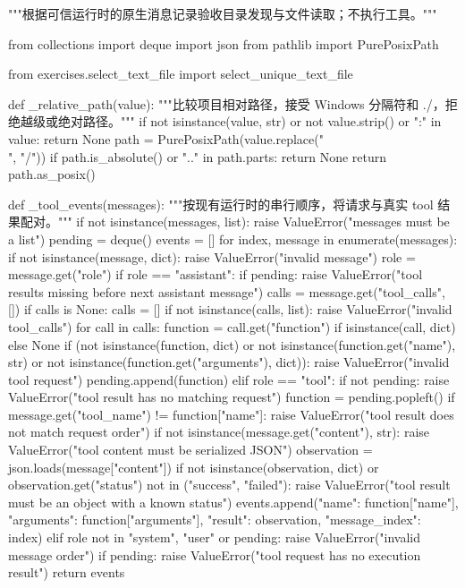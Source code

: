 \documentclass[UTF8,zihao=-4,fontset=fandol]{ctexart}
\begin{document}
\begin{Code}
"""根据可信运行时的原生消息记录验收目录发现与文件读取；不执行工具。"""

from collections import deque
import json
from pathlib import PurePosixPath

from exercises.select_text_file import select_unique_text_file


def _relative_path(value):
    """比较项目相对路径，接受 Windows 分隔符和 ./，拒绝越级或绝对路径。"""
    if not isinstance(value, str) or not value.strip() or ":" in value:
        return None
    path = PurePosixPath(value.replace("\\", "/"))
    if path.is_absolute() or ".." in path.parts:
        return None
    return path.as_posix()


def _tool_events(messages):
    """按现有运行时的串行顺序，将请求与真实 tool 结果配对。"""
    if not isinstance(messages, list):
        raise ValueError("messages must be a list")
    pending = deque()
    events = []
    for index, message in enumerate(messages):
        if not isinstance(message, dict):
            raise ValueError("invalid message")
        role = message.get("role")
        if role == "assistant":
            if pending:
                raise ValueError("tool results missing before next assistant message")
            calls = message.get("tool_calls", [])
            if calls is None:
                calls = []
            if not isinstance(calls, list):
                raise ValueError("invalid tool_calls")
            for call in calls:
                function = call.get("function") if isinstance(call, dict) else None
                if (not isinstance(function, dict)
                        or not isinstance(function.get("name"), str)
                        or not isinstance(function.get("arguments"), dict)):
                    raise ValueError("invalid tool request")
                pending.append(function)
        elif role == "tool":
            if not pending:
                raise ValueError("tool result has no matching request")
            function = pending.popleft()
            if message.get("tool_name") != function["name"]:
                raise ValueError("tool result does not match request order")
            if not isinstance(message.get("content"), str):
                raise ValueError("tool content must be serialized JSON")
            observation = json.loads(message["content"])
            if not isinstance(observation, dict) or observation.get("status") not in ("success", "failed"):
                raise ValueError("tool result must be an object with a known status")
            events.append({"name": function["name"], "arguments": function["arguments"],
                           "result": observation, "message_index": index})
        elif role not in {"system", "user"} or pending:
            raise ValueError("invalid message order")
    if pending:
        raise ValueError("tool request has no execution result")
    return events



\end{Code}
\end{document}
